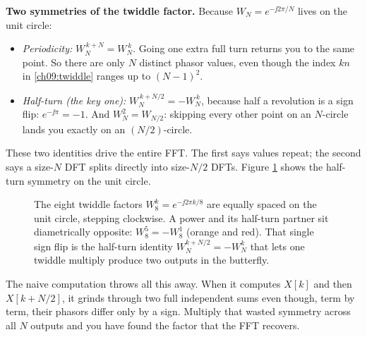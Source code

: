 \begin{whybox}
\textbf{Two symmetries of the twiddle factor.} Because $W_N = e^{-\jj 2\pi/N}$ lives on
the unit circle:
\begin{itemize}
\item \emph{Periodicity:} $W_N^{\,k+N} = W_N^{\,k}$. Going one extra full turn returns
you to the same point. So there are only $N$ distinct phasor values, even though
the index $kn$ in \eqref{ch09:twiddle} ranges up to $(N-1)^2$.
\item \emph{Half-turn (the key one):} $W_N^{\,k + N/2} = -W_N^{\,k}$, because half a
revolution is a sign flip: $e^{-\jj\pi} = -1$. And $W_N^{2} = W_{N/2}$: skipping every
other point on an $N$-circle lands you exactly on an $(N/2)$-circle.
\end{itemize}
These two identities drive the entire FFT. The first says values repeat; the
second says a size-$N$ DFT splits directly into size-$N/2$ DFTs. Figure
\ref{ch09:fig-twiddle} shows the half-turn symmetry on the unit circle.
\end{whybox}

\begin{figure}[H]
\centering
{}
\caption{The eight twiddle factors $W_8^{k}=e^{-\jj 2\pi k/8}$ are equally spaced on the
unit circle, stepping clockwise. A power and its half-turn partner sit diametrically
opposite: $W_8^{5}=-W_8^{1}$ (orange and red). That single sign flip is the half-turn
identity $W_N^{k+N/2}=-W_N^{k}$ that lets one twiddle multiply produce two outputs in the
butterfly.}
\label{ch09:fig-twiddle}
\end{figure}

The naive computation throws all this away. When it computes $X[k]$ and then $X[k+N/2]$,
it grinds through two full independent sums even though, term by term, their phasors
differ only by a sign. Multiply that wasted symmetry across all $N$ outputs and you have
found the factor that the FFT recovers.


